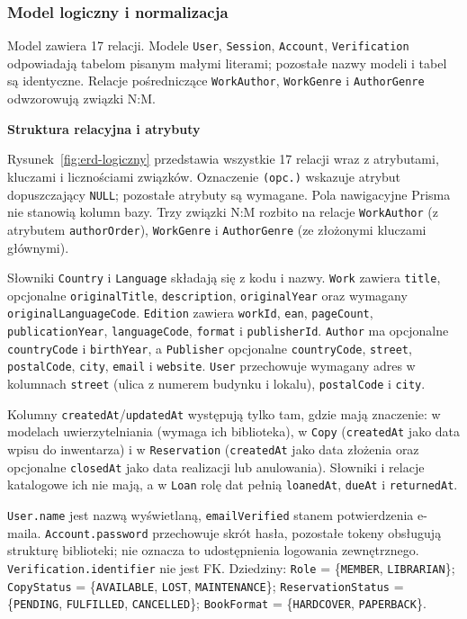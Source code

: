 \documentclass[11pt, a4paper]{article}
\begin{document}
\subsubsection{Model logiczny i normalizacja}
\label{subsec:model-logiczny}

Model zawiera 17 relacji. Modele \texttt{User}, \texttt{Session}, \texttt{Account}, \texttt{Verification} odpowiadają tabelom pisanym małymi literami; pozostałe nazwy modeli i tabel są identyczne. Relacje pośredniczące \texttt{WorkAuthor}, \texttt{WorkGenre} i \texttt{AuthorGenre} odwzorowują związki N:M.

\noindent\textbf{Struktura relacyjna i atrybuty}

Rysunek~\ref{fig:erd-logiczny} przedstawia wszystkie 17 relacji wraz z atrybutami, kluczami i licznościami związków. Oznaczenie \texttt{(opc.)} wskazuje atrybut dopuszczający \texttt{NULL}; pozostałe atrybuty są wymagane. Pola nawigacyjne Prisma nie stanowią kolumn bazy. Trzy związki N:M rozbito na relacje \texttt{WorkAuthor} (z atrybutem \texttt{authorOrder}), \texttt{WorkGenre} i \texttt{AuthorGenre} (ze złożonymi kluczami głównymi).

Słowniki \texttt{Country} i \texttt{Language} składają się z kodu i nazwy. \texttt{Work} zawiera \texttt{title}, opcjonalne \texttt{originalTitle}, \texttt{description}, \texttt{originalYear} oraz wymagany \texttt{originalLanguageCode}. \texttt{Edition} zawiera \texttt{workId}, \texttt{ean}, \texttt{pageCount}, \texttt{publicationYear}, \texttt{languageCode}, \texttt{format} i \texttt{publisherId}. \texttt{Author} ma opcjonalne \texttt{countryCode} i \texttt{birthYear}, a \texttt{Publisher} opcjonalne \texttt{countryCode}, \texttt{street}, \texttt{postalCode}, \texttt{city}, \texttt{email} i \texttt{website}. \texttt{User} przechowuje wymagany adres w kolumnach \texttt{street} (ulica z numerem budynku i lokalu), \texttt{postalCode} i \texttt{city}.

Kolumny \texttt{createdAt}/\texttt{updatedAt} występują tylko tam, gdzie mają znaczenie: w modelach uwierzytelniania (wymaga ich biblioteka), w \texttt{Copy} (\texttt{createdAt} jako data wpisu do inwentarza) i w \texttt{Reservation} (\texttt{createdAt} jako data złożenia oraz opcjonalne \texttt{closedAt} jako data realizacji lub anulowania). Słowniki i relacje katalogowe ich nie mają, a w \texttt{Loan} rolę dat pełnią \texttt{loanedAt}, \texttt{dueAt} i \texttt{returnedAt}.

\texttt{User.\allowbreak name} jest nazwą wyświetlaną, \texttt{emailVerified} stanem potwierdzenia e-maila. \texttt{Account.\allowbreak password} przechowuje skrót hasła, pozostałe tokeny obsługują strukturę biblioteki; nie oznacza to udostępnienia logowania zewnętrznego. \texttt{Verification.\allowbreak identifier} nie jest FK. Dziedziny: \texttt{Role} = \{\texttt{MEMBER}, \texttt{LIBRARIAN}\}; \texttt{CopyStatus} = \{\texttt{AVAILABLE}, \texttt{LOST}, \texttt{MAINTENANCE}\}; \texttt{ReservationStatus} = \{\texttt{PENDING}, \texttt{FULFILLED}, \texttt{CANCELLED}\}; \texttt{BookFormat} = \{\texttt{HARDCOVER}, \texttt{PAPERBACK}\}.
\end{document}
